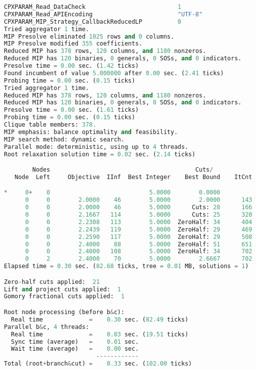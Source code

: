 \begin{lstlisting}[language=Python]
CPXPARAM_Read_DataCheck                          1
CPXPARAM_Read_APIEncoding                        "UTF-8"
CPXPARAM_MIP_Strategy_CallbackReducedLP          0
Tried aggregator 1 time.
MIP Presolve eliminated 1025 rows and 0 columns.
MIP Presolve modified 355 coefficients.
Reduced MIP has 378 rows, 120 columns, and 1180 nonzeros.
Reduced MIP has 120 binaries, 0 generals, 0 SOSs, and 0 indicators.
Presolve time = 0.00 sec. (1.42 ticks)
Found incumbent of value 5.000000 after 0.00 sec. (2.41 ticks)
Probing time = 0.00 sec. (0.15 ticks)
Tried aggregator 1 time.
Reduced MIP has 378 rows, 120 columns, and 1180 nonzeros.
Reduced MIP has 120 binaries, 0 generals, 0 SOSs, and 0 indicators.
Presolve time = 0.00 sec. (1.61 ticks)
Probing time = 0.00 sec. (0.15 ticks)
Clique table members: 378.
MIP emphasis: balance optimality and feasibility.
MIP search method: dynamic search.
Parallel mode: deterministic, using up to 4 threads.
Root relaxation solution time = 0.02 sec. (2.14 ticks)

        Nodes                                         Cuts/
   Node  Left     Objective  IInf  Best Integer    Best Bound    ItCnt     Gap

*     0+    0                            5.0000        0.0000           100.00%
      0     0        2.0000    46        5.0000        2.0000      143   60.00%
      0     0        2.0000    46        5.0000      Cuts: 28      166   60.00%
      0     0        2.1667   114        5.0000      Cuts: 25      320   56.67%
      0     0        2.2308   113        5.0000  ZeroHalf: 34      404   55.38%
      0     0        2.2439   119        5.0000  ZeroHalf: 29      469   55.12%
      0     0        2.2590   117        5.0000  ZeroHalf: 29      508   54.82%
      0     0        2.4000    88        5.0000  ZeroHalf: 51      651   52.00%
      0     0        2.4000   108        5.0000  ZeroHalf: 34      702   52.00%
      0     2        2.4000    70        5.0000        2.6667      702   46.67%
Elapsed time = 0.30 sec. (82.68 ticks, tree = 0.01 MB, solutions = 1)

Zero-half cuts applied:  21
Lift and project cuts applied:  1
Gomory fractional cuts applied:  1

Root node processing (before b&c):
  Real time             =    0.30 sec. (82.49 ticks)
Parallel b&c, 4 threads:
  Real time             =    0.03 sec. (19.51 ticks)
  Sync time (average)   =    0.01 sec.
  Wait time (average)   =    0.00 sec.
                          ------------
Total (root+branch&cut) =    0.33 sec. (102.00 ticks)

\end{lstlisting}